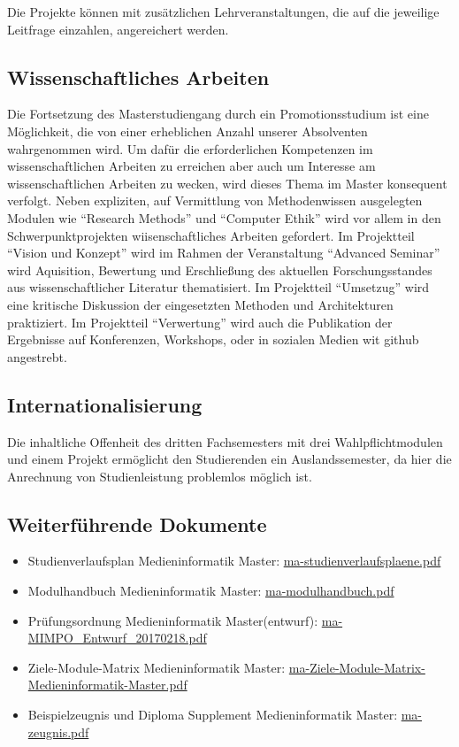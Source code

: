 Die Projekte können mit zusätzlichen Lehrveranstaltungen, die auf die
jeweilige Leitfrage einzahlen, angereichert werden.

\subsection{Wissenschaftliches
Arbeiten}\label{wissenschaftliches-arbeiten-1}

Die Fortsetzung des Masterstudiengang durch ein Promotionsstudium ist
eine Möglichkeit, die von einer erheblichen Anzahl unserer Absolventen
wahrgenommen wird. Um dafür die erforderlichen Kompetenzen im
wissenschaftlichen Arbeiten zu erreichen aber auch um Interesse am
wissenschaftlichen Arbeiten zu wecken, wird dieses Thema im Master
konsequent verfolgt. Neben expliziten, auf Vermittlung von
Methodenwissen ausgelegten Modulen wie ``Research Methods'' und
``Computer Ethik'' wird vor allem in den Schwerpunktprojekten
wiisenschaftliches Arbeiten gefordert. Im Projektteil ``Vision und
Konzept'' wird im Rahmen der Veranstaltung ``Advanced Seminar'' wird
Aquisition, Bewertung und Erschließung des aktuellen Forschungsstandes
aus wissenschaftlicher Literatur thematisiert. Im Projektteil
``Umsetzug'' wird eine kritische Diskussion der eingesetzten Methoden
und Architekturen praktiziert. Im Projektteil ``Verwertung'' wird auch
die Publikation der Ergebnisse auf Konferenzen, Workshops, oder in
sozialen Medien wit github angestrebt.

\subsection{Internationalisierung}\label{internationalisierung}

Die inhaltliche Offenheit des dritten Fachsemesters mit drei
Wahlpflichtmodulen und einem Projekt ermöglicht den Studierenden ein
Auslandssemester, da hier die Anrechnung von Studienleistung problemlos
möglich ist.

\subsection{Weiterführende
Dokumente}\label{weiterfuxfchrende-dokumente-4}

\begin{itemize}
\tightlist
\item
  Studienverlaufsplan Medieninformatik Master:
  \href{../anhaenge/ma-studienverlaufsplaene.pdf}{ma-studienverlaufsplaene.pdf}
\item
  Modulhandbuch Medieninformatik Master:
  \href{../anhaenge/ma-modulhandbuch.pdf}{ma-modulhandbuch.pdf}
\item
  Prüfungsordnung Medieninformatik Master(entwurf):
  \href{../anhaenge/ma-MIMPO_Entwurf_20170218.pdf}{ma-MIMPO\_Entwurf\_20170218.pdf}
\item
  Ziele-Module-Matrix Medieninformatik Master:
  \href{../anhaenge/ma-Ziele-Module-Matrix-Medieninformatik-Master.pdf}{ma-Ziele-Module-Matrix-Medieninformatik-Master.pdf}
\item
  Beispielzeugnis und Diploma Supplement Medieninformatik Master:
  \href{../anhaenge/ma-zeugnis.pdf}{ma-zeugnis.pdf}
\end{itemize}

